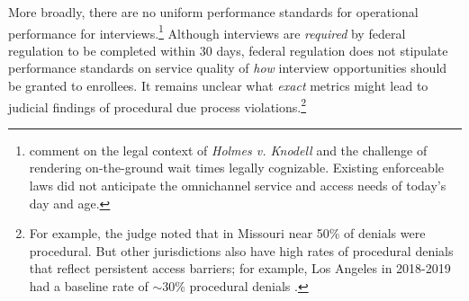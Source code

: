 \documentclass[manuscript,screen,authorversion]{acmart}
\begin{document}
More broadly, there are no uniform performance standards for operational performance for interviews.\footnote{\citet{howe_new_2025} comment on the legal context of \textit{Holmes v. Knodell} and the challenge of rendering on-the-ground wait times legally cognizable. Existing enforceable laws did not anticipate the omnichannel service and access needs of today's day and age.} Although interviews are \textit{required} by federal regulation to be completed within 30 days, federal regulation does not stipulate performance standards on service quality of \textit{how} interview opportunities should be granted to enrollees. It remains unclear what \textit{exact} metrics might lead to judicial findings of procedural due process violations.\footnote{For example, the judge noted that in Missouri near 50\% of denials were procedural. But other jurisdictions also have high rates of procedural denials that reflect persistent access barriers; for example, Los Angeles in 2018-2019 had a baseline rate of $\sim30$\% procedural denials \citet{giannella2024administrative}.} 
\end{document}

